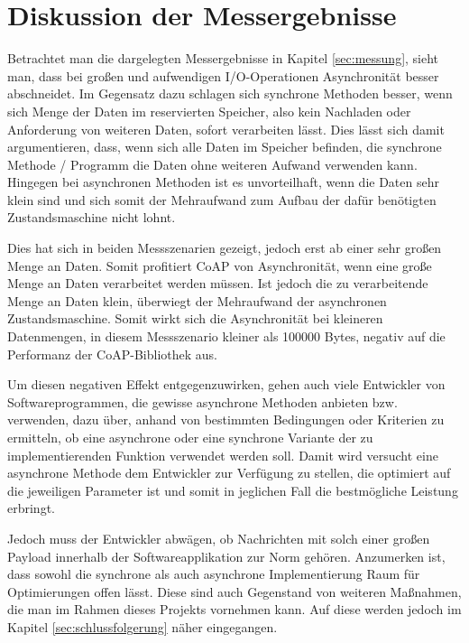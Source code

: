 \section{Diskussion der Messergebnisse}
\label{sec:diskussion-der-messergebnisse}

Betrachtet man die dargelegten Messergebnisse in Kapitel \ref{sec:messung}, sieht man, dass bei großen und aufwendigen I/O-Operationen Asynchronität besser abschneidet. Im Gegensatz dazu schlagen sich synchrone Methoden besser, wenn sich Menge der Daten im reservierten Speicher, also kein Nachladen oder Anforderung von weiteren Daten, sofort verarbeiten lässt. Dies lässt sich damit argumentieren, dass, wenn sich alle Daten im Speicher befinden, die synchrone Methode / Programm die Daten ohne weiteren Aufwand verwenden kann. Hingegen bei asynchronen Methoden ist es unvorteilhaft, wenn die Daten sehr klein sind und sich somit der Mehraufwand zum Aufbau der dafür benötigten Zustandsmaschine nicht lohnt.

Dies hat sich in beiden Messszenarien gezeigt, jedoch erst ab einer sehr großen Menge an Daten. Somit profitiert CoAP von Asynchronität, wenn eine große Menge an Daten verarbeitet werden müssen. Ist jedoch die zu verarbeitende Menge an Daten klein, überwiegt der Mehraufwand der asynchronen Zustandsmaschine. Somit wirkt sich die Asynchronität bei kleineren Datenmengen, in diesem Messszenario kleiner als 100000 Bytes, negativ auf die Performanz der CoAP-Bibliothek aus.

Um diesen negativen Effekt entgegenzuwirken, gehen auch viele Entwickler von Softwareprogrammen, die gewisse asynchrone Methoden anbieten bzw. verwenden, dazu über, anhand von bestimmten Bedingungen oder Kriterien zu ermitteln, ob eine asynchrone oder eine synchrone Variante der zu implementierenden Funktion verwendet werden soll. Damit wird versucht eine asynchrone Methode dem Entwickler zur Verfügung zu stellen, die optimiert auf die jeweiligen Parameter ist und somit in jeglichen Fall die bestmögliche Leistung erbringt.

Jedoch muss der Entwickler abwägen, ob Nachrichten mit solch einer großen Payload innerhalb der Softwareapplikation zur Norm gehören. Anzumerken ist, dass sowohl die synchrone als auch asynchrone Implementierung Raum für Optimierungen offen lässt. Diese sind auch Gegenstand von weiteren Maßnahmen, die man im Rahmen dieses Projekts vornehmen kann. Auf diese werden jedoch im Kapitel \ref{sec:schlussfolgerung} näher eingegangen.